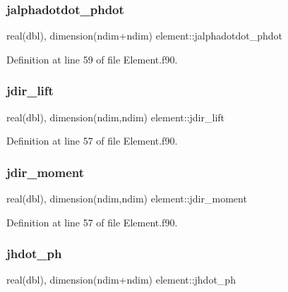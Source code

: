 \subsubsection{\texorpdfstring{jalphadotdot\+\_\+phdot}{jalphadotdot\_phdot}}
{\footnotesize\ttfamily real(dbl), dimension(ndim+ndim) element\+::jalphadotdot\+\_\+phdot\hspace{0.3cm}{\ttfamily [private]}}



Definition at line 59 of file Element.\+f90.

\mbox{\label{namespaceelement_a580ce3f83ad83383203449b2d8f4a3a4}} 
\subsubsection{\texorpdfstring{jdir\+\_\+lift}{jdir\_lift}}
{\footnotesize\ttfamily real(dbl), dimension(ndim,ndim) element\+::jdir\+\_\+lift\hspace{0.3cm}{\ttfamily [private]}}



Definition at line 57 of file Element.\+f90.

\mbox{\label{namespaceelement_a1dcc074ceaab61da55e1b1964ea3d235}} 
\subsubsection{\texorpdfstring{jdir\+\_\+moment}{jdir\_moment}}
{\footnotesize\ttfamily real(dbl), dimension(ndim,ndim) element\+::jdir\+\_\+moment\hspace{0.3cm}{\ttfamily [private]}}



Definition at line 57 of file Element.\+f90.

\mbox{\label{namespaceelement_a9ef70f6658a771b1ae6491475da5f9c3}} 
\subsubsection{\texorpdfstring{jhdot\+\_\+ph}{jhdot\_ph}}
{\footnotesize\ttfamily real(dbl), dimension(ndim+ndim) element\+::jhdot\+\_\+ph\hspace{0.3cm}{\ttfamily [private]}}



